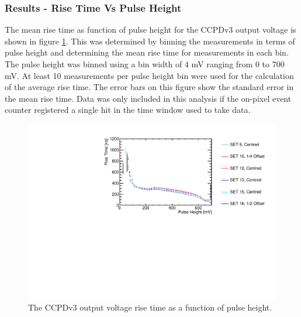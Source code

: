 \subsubsection{Results - Rise Time Vs Pulse Height}
\label{sec:resultsrisetimepulseheight}
The mean rise time as function of pulse height for the CCPDv3 output voltage is shown in figure \ref{fig:risetime}.  This was determined by binning the measurements in terms of pulse height and determining the mean rise time for measurements in each bin.  The pulse height was binned using a bin width of 4 mV ranging from 0 to 700 mV.  At least 10 measurements per pulse height bin were used for the calculation of the average rise time.  The error bars on this figure show the standard error in the mean rise time.  Data was only included in this analysis if the on-pixel event counter registered a single hit in the time window used to take data.

\begin{figure}[h!]
\centering
\includegraphics[width=1.0\textwidth]{CLICdpVertex/Plots/RadSourceAnalysis/AllSETs_RiseTime_PulseHeight.pdf}
\caption[The CCPDv3 output voltage rise time as a function of pulse height.]{The CCPDv3 output voltage rise time as a function of pulse height.}
\label{fig:risetime}
\end{figure}
 
